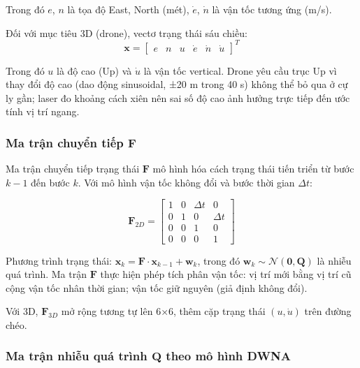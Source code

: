 Trong đó $e$, $n$ là tọa độ East, North (mét), $\dot{e}$, $\dot{n}$ là vận tốc tương ứng (m/s).

Đối với mục tiêu 3D (drone), vectơ trạng thái sáu chiều:
\begin{equation}
    \mathbf{x} = \begin{bmatrix} e & n & u & \dot{e} & \dot{n} & \dot{u} \end{bmatrix}^T
\end{equation}

Trong đó $u$ là độ cao (Up) và $\dot{u}$ là vận tốc vertical. Drone yêu cầu trục Up vì thay đổi độ cao (dao động sinusoidal, ±20 m trong 40 s) không thể bỏ qua ở cự ly gần; laser đo khoảng cách xiên nên sai số độ cao ảnh hưởng trực tiếp đến ước tính vị trí ngang.

\subsubsection{Ma trận chuyển tiếp \texorpdfstring{$\mathbf{F}$}{F}}

\hspace{0.5cm} Ma trận chuyển tiếp trạng thái $\mathbf{F}$ mô hình hóa cách trạng thái tiến triển từ bước $k-1$ đến bước $k$. Với mô hình vận tốc không đổi và bước thời gian $\Delta t$:

\begin{equation}
    \mathbf{F}_{2D} = \begin{bmatrix}
        1 & 0 & \Delta t & 0 \\
        0 & 1 & 0 & \Delta t \\
        0 & 0 & 1 & 0 \\
        0 & 0 & 0 & 1
    \end{bmatrix}
\end{equation}

Phương trình trạng thái: $\mathbf{x}_k = \mathbf{F} \cdot \mathbf{x}_{k-1} + \mathbf{w}_k$, trong đó $\mathbf{w}_k \sim \mathcal{N}(\mathbf{0}, \mathbf{Q})$ là nhiễu quá trình. Ma trận $\mathbf{F}$ thực hiện phép tích phân vận tốc: vị trí mới bằng vị trí cũ cộng vận tốc nhân thời gian; vận tốc giữ nguyên (giả định không đổi).

Với 3D, $\mathbf{F}_{3D}$ mở rộng tương tự lên 6×6, thêm cặp trạng thái $(u, \dot{u})$ trên đường chéo.

\subsubsection{Ma trận nhiễu quá trình \texorpdfstring{$\mathbf{Q}$}{Q} theo mô hình DWNA}

